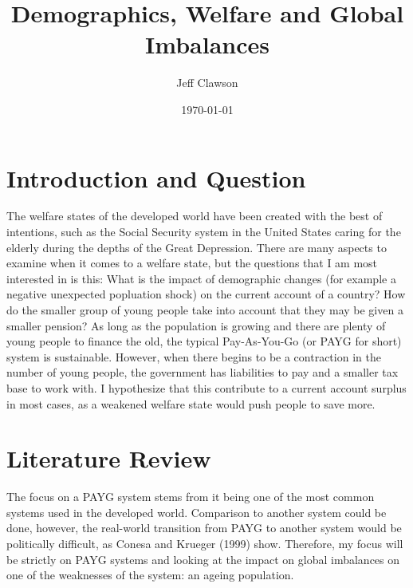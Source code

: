 \documentclass[dvips,12pt]{article}
\begin{document}

\title{Demographics, Welfare and Global Imbalances}
\author{Jeff Clawson}
\date{\today}



\maketitle


\section{Introduction and Question}

The welfare states of the developed world have been created with the best of intentions, such as the Social Security system in the United States caring for the elderly during the depths of the Great Depression.
There are many aspects to examine when it comes to a welfare state, but the questions that I 
am most interested in is this: What is the impact of demographic changes (for example a 
negative unexpected popluation shock) on the current account of a country? How do the smaller group of young people take into account that they may be given a smaller pension? As long as the population 
is growing and there are plenty of young people to finance the old, the typical 
Pay-As-You-Go (or PAYG for short) system 
is sustainable. However, when there begins to be a contraction in the number of young people, 
the government has liabilities to pay and a smaller tax base to work with. I hypothesize that this contribute to a current account surplus in most cases, as a weakened welfare state would push people to save more. \\


\section{Literature Review}
The focus on a PAYG system stems from it being one of the most common systems used in the developed world. Comparison to another system could be done, however, the real-world transition from PAYG to another system would be politically difficult, as Conesa and Krueger (1999) show. Therefore, my focus will be strictly on PAYG systems and looking at the impact on global imbalances on one of the weaknesses of the system: an ageing population.
\end{document}
